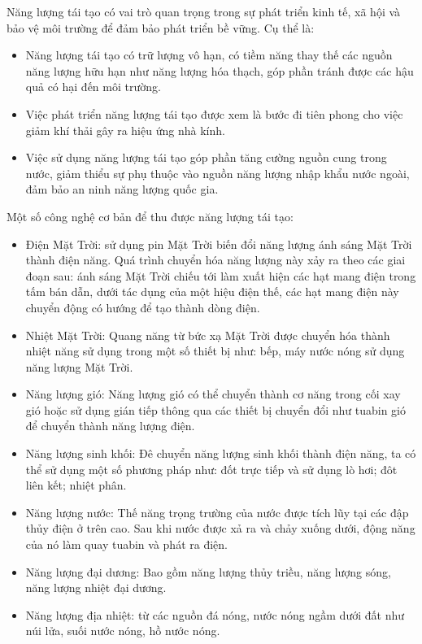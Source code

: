 Năng lượng tái tạo có vai trò quan trọng trong sự phát triển kinh tế, xã hội và bảo vệ môi trường để đảm bảo phát triển bề vững. Cụ thể là:
\begin{itemize}
	\item Năng lượng tái tạo có trữ lượng vô hạn, có tiềm năng thay thế các nguồn năng lượng hữu hạn như năng lượng hóa thạch, góp phần tránh được các hậu quả có hại đến môi trường.
	\item Việc phát triển năng lượng tái tạo được xem là bước đi tiên phong cho việc giảm khí thải gây ra hiệu ứng nhà kính.
	\item Việc sử dụng năng lượng tái tạo góp phần tăng cường nguồn cung trong nước, giảm thiểu sự phụ thuộc vào nguồn năng lượng nhập khẩu nước ngoài, đảm bảo an ninh năng lượng quốc gia.
\end{itemize}

Một số công nghệ cơ bản để thu được năng lượng tái tạo:
\begin{itemize}
	\item Điện Mặt Trời: sử dụng pin Mặt Trời biến đổi năng lượng ánh sáng Mặt Trời thành điện năng. Quá trình chuyển hóa năng lượng này xảy ra theo các giai đoạn sau: ánh sáng Mặt Trời chiếu tới làm xuất hiện các hạt mang điện trong tấm bán dẫn, dưới tác dụng của một hiệu điện thế, các hạt mang điện này chuyển động có hướng để tạo thành dòng điện.
	\item Nhiệt Mặt Trời: Quang năng từ bức xạ Mặt Trời được chuyển hóa thành nhiệt năng sử dụng trong một số thiết bị như: bếp, máy nước nóng sử dụng năng lượng Mặt Trời.
	\item Năng lượng gió: Năng lượng gió có thể chuyển thành cơ năng trong cối xay gió hoặc sử dụng gián tiếp thông qua các thiết bị chuyển đổi như tuabin gió để chuyển thành năng lượng điện.
	\item Năng lượng sinh khối: Đê chuyển năng lượng sinh khối thành điện năng, ta có thể sử dụng một số phương pháp như: đốt trực tiếp và sử dụng lò hơi; đôt liên kết; nhiệt phân.
	\item Năng lượng nước: Thế năng trọng trường của nước được tích lũy tại các đập thủy điện ở trên cao. Sau khi nước được xả ra và chảy xuống dưới, động năng của nó làm quay tuabin và phát ra điện.
	\item Năng lượng đại dương: Bao gồm năng lượng thủy triều, năng lượng sóng, năng lượng nhiệt đại dương.
	\item Năng lượng địa nhiệt: từ các nguồn đá nóng, nước nóng ngầm dưới đất như núi lửa, suối nước nóng, hồ nước nóng.
\end{itemize}
